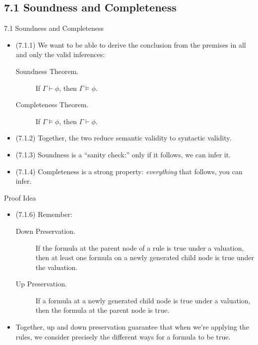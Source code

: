 \subsection{7.1 Soundness and Completeness}

\begin{frame}{7.1 Soundness and Completeness}

	\begin{itemize}
		
		\item (7.1.1) We want to be able to  derive the conclusion from the premises in all and only the valid inferences:
		
				\begin{description}
		
			\item[Soundness Theorem.] If $\Gamma\vdash\phi$, then $\Gamma\vDash\phi$.
			
			\item[Completeness Theorem.] If $\Gamma\vDash\phi$, then $\Gamma\vdash\phi$.
		
		\end{description}
	
		\item (7.1.2) Together, the two reduce semantic validity to syntactic validity.
	
		\item (7.1.3) Soundness is a ``sanity check:'' only if it follows, we can infer it.
		
		\item (7.1.4) Completeness is a strong property: \emph{everything} that follows, you can infer.
		
	\end{itemize}

\end{frame}

\begin{frame}{Proof Idea}

	\begin{itemize}
	
		\item (7.1.6) Remember:
		
		\begin{description}
			
				\item[Down Preservation.] If the formula at the parent node of a rule is true under a valuation, then at least one formula on a newly generated child node is true under the valuation.
				
				\item[Up Preservation.] If a formula at a newly generated child node is true under a valuation, then the formula at the parent node is true.
				
		\end{description}
		
		\item Together, up and down preservation guarantee that when we're applying the rules, we consider precisely the different ways for a formula to be true.
	
	\end{itemize}


\end{frame}


